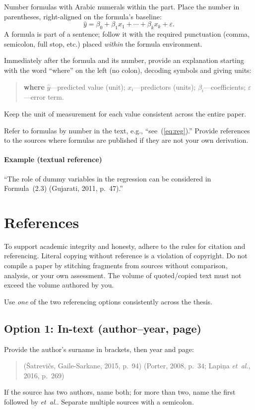 Number formulas with Arabic numerals within the part. Place the number in parentheses, right-aligned on the formula’s baseline:
\begin{equation}
  \widehat{y} = \beta_{0} + \beta_{1}x_{1} + \cdots + \beta_{k}x_{k} + \varepsilon. \label{eq:reg}
\end{equation}
A formula is part of a sentence; follow it with the required punctuation (comma, semicolon, full stop, etc.) placed \emph{within} the formula environment.

Immediately after the formula and its number, provide an explanation starting with the word ``where'' on the left (no colon), decoding symbols and giving units:
\begin{quote}
\textbf{where} $\widehat{y}$—predicted value (unit); $x_i$—predictors (units); $\beta_i$—coefficients; $\varepsilon$—error term.
\end{quote}
Keep the unit of measurement for each value consistent across the entire paper.

Refer to formulas by number in the text, e.g., ``see~(\ref{eq:reg}).'' Provide references to the sources where formulas are published if they are not your own derivation.

\paragraph*{Example (textual reference)}
``The role of dummy variables in the regression can be considered in Formula~(2.3) (Gujarati, 2011, p.~47).''

\section{References}

To support academic integrity and honesty, adhere to the rules for citation and referencing. Literal copying without reference is a violation of copyright. Do not compile a paper by stitching fragments from sources without comparison, analysis, or your own assessment. The volume of quoted/copied text must not exceed the volume authored by you.

Use \emph{one} of the two referencing options consistently across the thesis.

\subsection*{Option 1: In-text (author--year, page)}
Provide the author’s surname in brackets, then year and page:
\begin{quote}
(Šatrevičs, Gaile-Sarkane, 2015, p.~94) \quad (Porter, 2008, p.~34; Lapiņa \emph{et~al.}, 2016, p.~269)
\end{quote}
If the source has two authors, name both; for more than two, name the first followed by \emph{et~al.}. Separate multiple sources with a semicolon.

